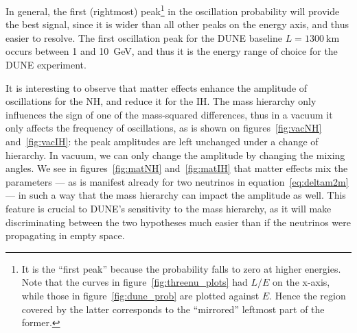 In general, the first (rightmost) peak\footnote{It is the ``first peak''
because the probability falls to zero at higher energies. Note that the curves
in figure~\ref{fig:threenu_plots} had $L/E$ on the x-axis, while those in
figure~\ref{fig:dune_prob} are plotted against $E$. Hence the region covered by
the latter corresponds to the ``mirrored'' leftmost part of the former.} in the oscillation
probability will provide the best signal, since it is wider than all other
peaks on the energy axis, and thus easier to resolve.
The first oscillation peak for the DUNE baseline $L=\SI{1300}{\km}$ occurs between 1 and
\SI{10}{\GeV}, and thus it is the
energy range of choice for the DUNE experiment. 

It is interesting to observe that matter effects enhance the amplitude of
oscillations for the NH, and reduce it for the IH. The mass hierarchy only
influences the sign of one of the mass-squared differences, thus in a vacuum it
only affects the frequency of oscillations, as is shown on
figures~\ref{fig:vacNH} and~\ref{fig:vacIH}: the peak amplitudes are left
unchanged under a change of hierarchy. In vacuum, we can only change the
amplitude by changing the mixing angles. We see in figures~\ref{fig:matNH}
and~\ref{fig:matIH} that matter effects mix the parameters --- as is manifest
already for two neutrinos in equation~\ref{eq:deltam2m} --- in such a way that the
mass hierarchy can impact the amplitude as well. This feature is crucial to
DUNE's sensitivity to the mass hierarchy, as it will make discriminating
between the two hypotheses much easier than if the neutrinos were propagating
in empty space.

